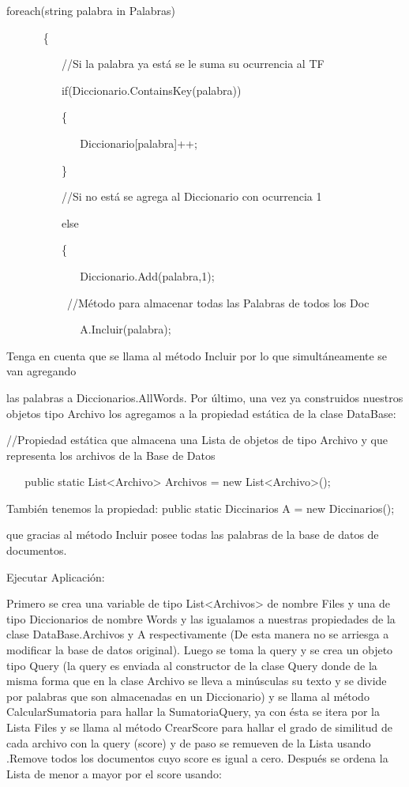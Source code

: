 \documentclass[
]{article}
\begin{document}
foreach(string palabra in Palabras)

~ ~ ~ ~ \{

~ ~ ~ ~ ~ ~ //Si la palabra ya está se le suma su ocurrencia al TF

~ ~ ~ ~ ~ ~ if(Diccionario.ContainsKey(palabra))

~ ~ ~ ~ ~ ~ \{

~ ~ ~ ~ ~ ~ ~ ~ Diccionario{[}palabra{]}++;

~ ~ ~ ~ ~ ~ \}

~ ~ ~ ~ ~ ~ //Si no está se agrega al Diccionario con ocurrencia 1

~ ~ ~ ~ ~ ~ else

~ ~ ~ ~ ~ ~ \{

~ ~ ~ ~ ~ ~ ~ ~ Diccionario.Add(palabra,1);

~ ~ ~ ~ ~ ~ ~//Método para almacenar todas las Palabras de todos los Doc

~ ~ ~ ~ ~ ~ ~ ~ A.Incluir(palabra);

Tenga en cuenta que se llama al método Incluir por lo que
simultáneamente se van agregando

las palabras a Diccionarios.AllWords. Por último, una vez ya construidos
nuestros objetos tipo Archivo los agregamos a la propiedad estática de
la clase DataBase:

//Propiedad estática que almacena una Lista de objetos de tipo Archivo y
que representa los archivos de la Base de Datos

~ ~ public static List\textless Archivo\textgreater{} Archivos = new
List\textless Archivo\textgreater();

También tenemos la propiedad: public static Diccinarios A = new
Diccinarios();

que gracias al método Incluir posee todas las palabras de la base de
datos de documentos.

Ejecutar Aplicación:

Primero se crea una variable de tipo
List\textless Archivos\textgreater{} de nombre Files y una de tipo
Diccionarios de nombre Words y las igualamos a nuestras propiedades de
la clase DataBase.Archivos y A respectivamente (De esta manera no se
arriesga a modificar la base de datos original). Luego se toma la query
y se crea un objeto tipo Query (la query es enviada al constructor de la
clase Query donde de la misma forma que en la clase Archivo se lleva a
minúsculas su texto y se divide por palabras que son almacenadas en un
Diccionario) y se llama al método CalcularSumatoria para hallar la
SumatoriaQuery, ya con ésta se itera por la Lista Files y se llama al
método CrearScore para hallar el grado de similitud de cada archivo con
la query (score) y de paso se remueven de la Lista usando .Remove todos
los documentos cuyo score es igual a cero. Después se ordena la Lista de
menor a mayor por el score usando:
\end{document}
